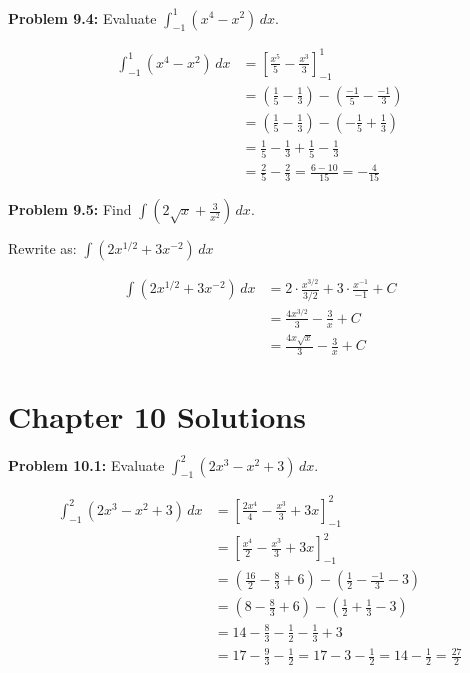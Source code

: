 \documentclass[12pt,a4paper]{book}
\theoremstyle{definition}
\begin{document}
\begin{solution}
\textbf{Problem 9.4:} Evaluate $\int_{-1}^1 (x^4 - x^2) \, dx$.

\begin{align}
\int_{-1}^1 (x^4 - x^2) \, dx &= \left[ \frac{x^5}{5} - \frac{x^3}{3} \right]_{-1}^1\\
&= \left( \frac{1}{5} - \frac{1}{3} \right) - \left( \frac{-1}{5} - \frac{-1}{3} \right)\\
&= \left( \frac{1}{5} - \frac{1}{3} \right) - \left( -\frac{1}{5} + \frac{1}{3} \right)\\
&= \frac{1}{5} - \frac{1}{3} + \frac{1}{5} - \frac{1}{3}\\
&= \frac{2}{5} - \frac{2}{3} = \frac{6 - 10}{15} = -\frac{4}{15}
\end{align}
\end{solution}

\begin{solution}
\textbf{Problem 9.5:} Find $\int (2\sqrt{x} + \frac{3}{x^2}) \, dx$.

Rewrite as: $\int (2x^{1/2} + 3x^{-2}) \, dx$

\begin{align}
\int (2x^{1/2} + 3x^{-2}) \, dx &= 2 \cdot \frac{x^{3/2}}{3/2} + 3 \cdot \frac{x^{-1}}{-1} + C\\
&= \frac{4x^{3/2}}{3} - \frac{3}{x} + C\\
&= \frac{4x\sqrt{x}}{3} - \frac{3}{x} + C
\end{align}
\end{solution}

\section*{Chapter 10 Solutions}

\begin{solution}
\textbf{Problem 10.1:} Evaluate $\int_{-1}^2 (2x^3 - x^2 + 3) \, dx$.

\begin{align}
\int_{-1}^2 (2x^3 - x^2 + 3) \, dx &= \left[ \frac{2x^4}{4} - \frac{x^3}{3} + 3x \right]_{-1}^2\\
&= \left[ \frac{x^4}{2} - \frac{x^3}{3} + 3x \right]_{-1}^2\\
&= \left( \frac{16}{2} - \frac{8}{3} + 6 \right) - \left( \frac{1}{2} - \frac{-1}{3} - 3 \right)\\
&= \left( 8 - \frac{8}{3} + 6 \right) - \left( \frac{1}{2} + \frac{1}{3} - 3 \right)\\
&= 14 - \frac{8}{3} - \frac{1}{2} - \frac{1}{3} + 3\\
&= 17 - \frac{9}{3} - \frac{1}{2} = 17 - 3 - \frac{1}{2} = 14 - \frac{1}{2} = \frac{27}{2}
\end{align}
\end{solution}
\end{document}
